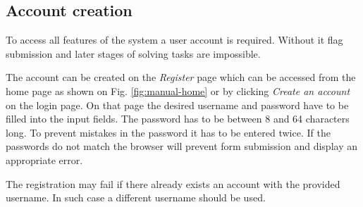 \subsection{Account creation}
\label{chap:account-creation}

To access all features of the system a user account is required. Without it flag submission and later stages of solving tasks are impossible.

The account can be created on the \textit{Register} page which can be accessed from the home page as shown on Fig. \ref{fig:manual-home} or by clicking \textit{Create an account} on the login page. On that page the desired username and password have to be filled into the input fields. The password has to be between 8 and 64 characters long. To prevent mistakes in the password it has to be entered twice. If the passwords do not match the browser will prevent form submission and display an appropriate error.

The registration may fail if there already exists an account with the provided username. In such case a different username should be used.

